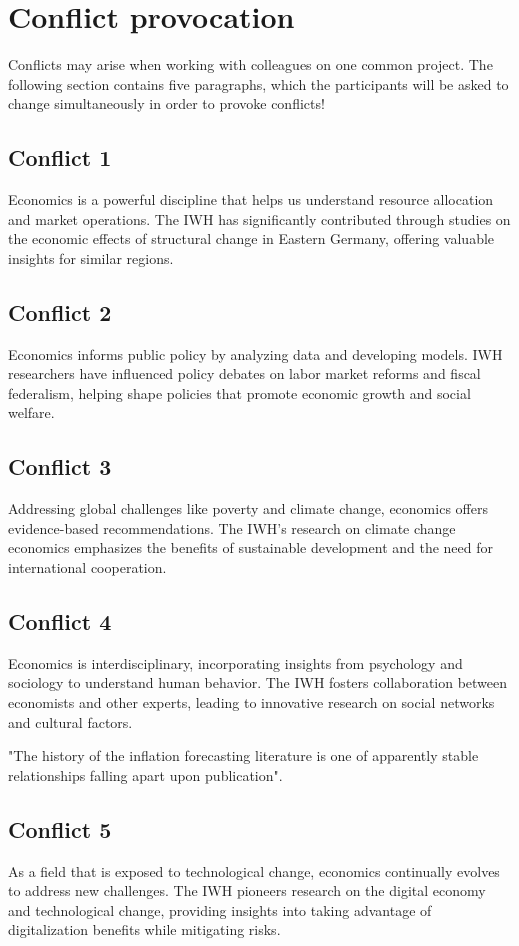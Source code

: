 \documentclass{article}
\begin{document}
\section{Conflict provocation}
Conflicts may arise when working with colleagues on one common project. The following section contains five paragraphs, which the participants will be asked to change simultaneously in order to provoke conflicts!

\subsection{Conflict 1}
Economics is a powerful discipline that helps us understand resource allocation and market operations. The IWH has significantly contributed through studies on the economic effects of structural change in Eastern Germany, offering valuable insights for similar regions.

\subsection{Conflict 2}
Economics informs public policy by analyzing data and developing models. IWH researchers have influenced policy debates on labor market reforms and fiscal federalism, helping shape policies that promote economic growth and social welfare.

\subsection{Conflict 3}
Addressing global challenges like poverty and climate change, economics offers evidence-based recommendations. The IWH's research on climate change economics emphasizes the benefits of sustainable development and the need for international cooperation.

\subsection{Conflict 4}
Economics is interdisciplinary, incorporating insights from psychology and sociology to understand human behavior. The IWH fosters collaboration between economists and other experts, leading to innovative research on social networks and cultural factors.

"The history of the inflation forecasting literature is one of apparently stable relationships falling apart upon publication".

\subsection{Conflict 5}
As a field that is exposed to technological change, economics continually evolves to address new challenges. The IWH pioneers research on the digital economy and technological change, providing insights into taking advantage of digitalization benefits while mitigating risks.
\end{document}
